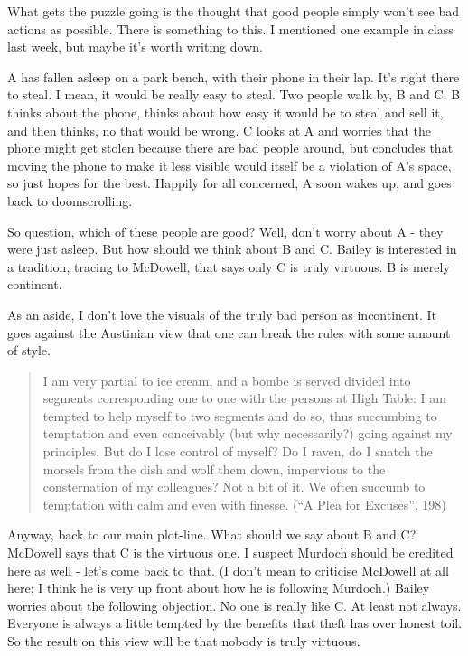 \documentclass[
]{article}
\begin{document}
What gets the puzzle going is the thought that good people simply won't
see bad actions as possible. There is something to this. I mentioned one
example in class last week, but maybe it's worth writing down.

A has fallen asleep on a park bench, with their phone in their lap. It's
right there to steal. I mean, it would be really easy to steal. Two
people walk by, B and C. B thinks about the phone, thinks about how easy
it would be to steal and sell it, and then thinks, no that would be
wrong. C looks at A and worries that the phone might get stolen because
there are bad people around, but concludes that moving the phone to make
it less visible would itself be a violation of A's space, so just hopes
for the best. Happily for all concerned, A soon wakes up, and goes back
to doomscrolling.

So question, which of these people are good? Well, don't worry about A -
they were just asleep. But how should we think about B and C. Bailey is
interested in a tradition, tracing to McDowell, that says only C is
truly virtuous. B is merely continent.

As an aside, I don't love the visuals of the truly bad person as
incontinent. It goes against the Austinian view that one can break the
rules with some amount of style.

\begin{quote}
I am very partial to ice cream, and a bombe is served divided into
segments corresponding one to one with the persons at High Table: I am
tempted to help myself to two segments and do so, thus succumbing to
temptation and even conceivably (but why necessarily?) going against my
principles. But do I lose control of myself? Do I raven, do I snatch the
morsels from the dish and wolf them down, impervious to the
consternation of my colleagues? Not a bit of it. We often succumb to
temptation with calm and even with finesse. (``A Plea for Excuses'',
198)
\end{quote}

Anyway, back to our main plot-line. What should we say about B and C?
McDowell says that C is the virtuous one. I suspect Murdoch should be
credited here as well - let's come back to that. (I don't mean to
criticise McDowell at all here; I think he is very up front about how he
is following Murdoch.) Bailey worries about the following objection. No
one is really like C. At least not always. Everyone is always a little
tempted by the benefits that theft has over honest toil. So the result
on this view will be that nobody is truly virtuous.
\end{document}
